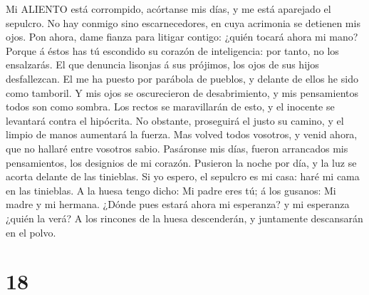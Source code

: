  Mi ALIENTO está corrompido, acórtanse mis días, y me está
aparejado el sepulcro.  No hay conmigo sino escarnecedores,
en cuya acrimonia se detienen mis ojos.  Pon ahora, dame
fianza para litigar contigo: ¿quién tocará ahora mi mano? 
Porque á éstos has tú escondido su corazón de inteligencia: por tanto,
no los ensalzarás.  El que denuncia lisonjas á sus prójimos,
los ojos de sus hijos desfallezcan.  El me ha puesto por
parábola de pueblos, y delante de ellos he sido como tamboril.
 Y mis ojos se oscurecieron de desabrimiento, y mis
pensamientos todos son como sombra.  Los rectos se
maravillarán de esto, y el inocente se levantará contra el hipócrita.
 No obstante, proseguirá el justo su camino, y el limpio de
manos aumentará la fuerza.  Mas volved todos vosotros, y
venid ahora, que no hallaré entre vosotros sabio. 
Pasáronse mis días, fueron arrancados mis pensamientos, los designios de
mi corazón.  Pusieron la noche por día, y la luz se acorta
delante de las tinieblas.  Si yo espero, el sepulcro es mi
casa: haré mi cama en las tinieblas.  A la huesa tengo
dicho: Mi padre eres tú; á los gusanos: Mi madre y mi hermana.
 ¿Dónde pues estará ahora mi esperanza? y mi esperanza
¿quién la verá?  A los rincones de la huesa descenderán, y
juntamente descansarán en el polvo.

\hypertarget{section-17}{%
\section{18}\label{section-17}}

